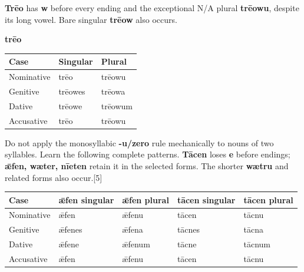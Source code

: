 \textbf{Trēo} has \textbf{w} before every ending and the exceptional N/\allowbreak{}A plural \textbf{trēowu}, despite its long vowel. Bare singular \textbf{trēow} also occurs.

\textbf{trēo}\par\nobreak

\par\begingroup
\fontsize{10.5}{13.2}\selectfont
\setlength{\LTleft}{0pt}\setlength{\LTright}{\fill}
\noindent
\begin{tabular}{@{}>{\raggedright\arraybackslash}p{39.459mm}>{\raggedright\arraybackslash}p{39.459mm}>{\raggedright\arraybackslash}p{39.459mm}@{}}
\toprule
\textbf{Case} & \textbf{Singular} & \textbf{Plural} \\
\midrule
Nominative & trēo & trēowu \\
Genitive & trēowes & trēowa \\
Dative & trēowe & trēowum \\
Accusative & trēo & trēowu \\
\bottomrule
\end{tabular}
\par\endgroup

Do not apply the monosyllabic \textbf{-u/\allowbreak{}zero} rule mechanically to nouns of two syllables. Learn the following complete patterns. \textbf{Tācen} loses \textbf{e} before endings; \textbf{ǣfen, wæter, nīeten} retain it in the selected forms. The shorter \textbf{wætru} and related forms also occur.[5]

\par\begingroup
\fontsize{10.5}{13.2}\selectfont
\setlength{\LTleft}{0pt}\setlength{\LTright}{\fill}
\noindent
\begin{tabular}{@{}>{\raggedright\arraybackslash}p{22.0mm}>{\raggedright\arraybackslash}p{22.688mm}>{\raggedright\arraybackslash}p{22.688mm}>{\raggedright\arraybackslash}p{22.688mm}>{\raggedright\arraybackslash}p{22.688mm}@{}}
\toprule
\textbf{Case} & \textbf{ǣfen singular} & \textbf{ǣfen plural} & \textbf{tācen singular} & \textbf{tācen plural} \\
\midrule
Nominative & ǣfen & ǣfenu & tācen & tācnu \\
Genitive & ǣfenes & ǣfena & tācnes & tācna \\
Dative & ǣfene & ǣfenum & tācne & tācnum \\
Accusative & ǣfen & ǣfenu & tācen & tācnu \\
\bottomrule
\end{tabular}
\par\endgroup


